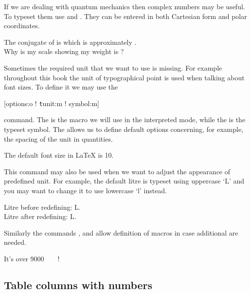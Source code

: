 If we are dealing with quantum mechanics then complex numbers may be useful.
To typeset them use  and . They can be entered in
both Cartesian form and polar coordinates.

\begin{example}[examplewidth=0.4\linewidth]
The conjugate of  is
 which is approximately
. \\
Why is my scale showing my
weight is ?
\end{example}

Sometimes the required unit that we want to use is missing. For example
throughout this book the unit of typographical point is used when talking about
font sizes. To define it we may use the
\begin{lscommand}
  [options:o ! \texttt{t}unit:m ! symbol:m]
\end{lscommand}
command. The  is the macro we will use in the interpreted mode,
while the  is the typeset symbol. The  allows us to
define default options concerning, for example, the spacing of the unit in
quantities.
\begin{example}
The default font size
in \LaTeX{} is \qty{10}{\pt}.
\end{example}

This command may also be used when we want to adjust the appearance of
predefined unit. For example, the default litre is typeset using uppercase
\enquote*{L} and you may want to change it to use lowercase \enquote*{l}
instead.
\begin{example}[examplewidth=0.4\linewidth]
Litre before redefining: \unit{\L}. \\
Litre after redefining: \unit{\L}.
\end{example}

Similarly the commands ,  and
 allow definition of macros in case additional are
needed.
\begin{example}[examplewidth=0.4\linewidth]
\DeclareSIPower\quartic{}
\DeclareSIPrefix{}
\DeclareSIQualifier{}

It's over \qty{9000}{\quartic\decakilo\pt\polymer}!
\end{example}

\subsection{Table columns with numbers}

